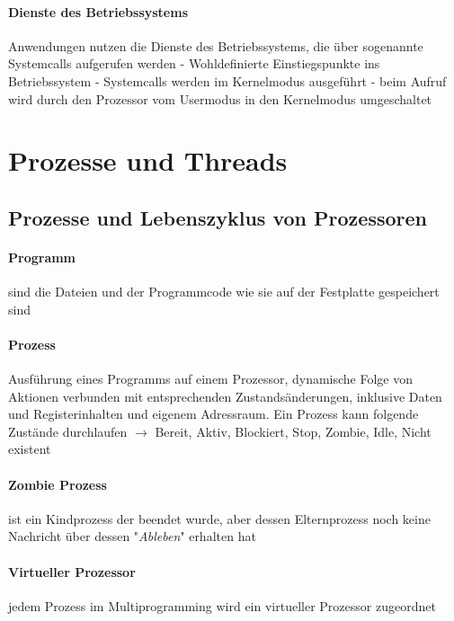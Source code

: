 \documentclass[11pt,a4paper,landscape]{article}
\begin{document}
\begin{multicols*}{3}
	\paragraph{Dienste des Betriebssystems} Anwendungen nutzen die Dienste des Betriebssystems, die über sogenannte Systemcalls aufgerufen werden - Wohldefinierte Einstiegspunkte ins Betriebssystem - Systemcalls werden im Kernelmodus ausgeführt - beim Aufruf wird durch den Prozessor vom Usermodus in den Kernelmodus umgeschaltet
	\section{Prozesse und Threads}
	\subsection{Prozesse und Lebenszyklus von Prozessoren}
	\paragraph{Programm} sind die Dateien und der Programmcode wie sie auf der Festplatte gespeichert sind
	\paragraph{Prozess} Ausführung eines Programms auf einem Prozessor, dynamische Folge von Aktionen verbunden mit entsprechenden Zustandsänderungen, inklusive Daten und Registerinhalten und eigenem Adressraum. Ein Prozess kann folgende Zustände durchlaufen $\rightarrow$ Bereit, Aktiv, Blockiert, Stop, Zombie, Idle, Nicht existent
	\paragraph{Zombie Prozess} ist ein Kindprozess der beendet wurde, aber dessen Elternprozess noch keine Nachricht über dessen "\textit{Ableben}" erhalten hat
	\paragraph{Virtueller Prozessor} jedem Prozess im Multiprogramming wird ein virtueller Prozessor zugeordnet

\end{multicols*}
\end{document}
